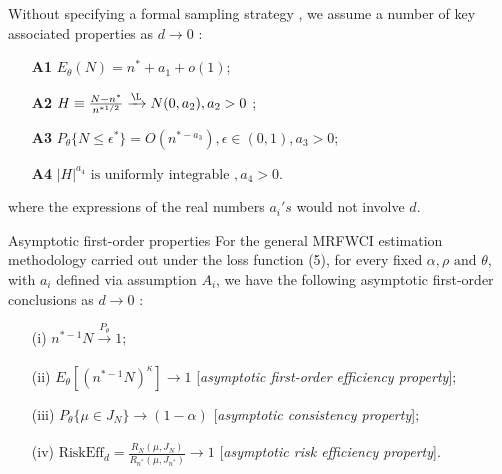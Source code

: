 \documentclass [xcolor=svgnames, t] {beamer}
\begin{document}

\begin{frame}{}
\vspace{15mm}
 Without specifying a formal sampling strategy , we assume a number of key associated properties as $d \xrightarrow{} 0$ :
   
    \begin{itemize}
        \item[\textbf{A1}] $ E_{\theta}(N)=n^* +a_1 +o(1)$;
         \item[\textbf{A2}] $H \equiv \frac{N-n^*}{n^{*1/2}} \xrightarrow{\L} N(0,a_2), a_2>0$ ;
          \item[\textbf{A3}] $P_{\theta}\{ N \le \epsilon^*\}=O(n^{*-a_3}),\epsilon \in (0,1), a_3>0$;
           \item[\textbf{A4}] $|H|^{a_4} \text{ is uniformly integrable },a_4 >0$.
    \end{itemize}
    
    where the expressions of the real numbers $a_i's$ would not involve $d$.
\end{frame}
\begin{frame}{Asymptotic first-order properties}
\vspace{7mm}
For the general MRFWCI estimation methodology carried out under the loss function (5), for every fixed $\alpha, \rho \text{ and } \theta$, with $a_i$ defined via assumption $A_i$, we have the following asymptotic first-order conclusions as $d \xrightarrow{} 0$ :

\begin{itemize}
\item[(i)] $n^{*-1}N \xrightarrow[]{P_{\theta}}1$;
\item[(ii)] $E_{\theta}[(n^{*-1}N)^{\kappa}] \xrightarrow[]{} 1$ [\textit{asymptotic first-order efficiency property}];
\item[(iii)] $P_{\theta} \{ \mu \in J_N\} \xrightarrow[]{} (1-\alpha)$ [\textit{asymptotic consistency property}];
\item[(iv)] $\text{RiskEff}_d =\frac{R_N(\mu,J_N)}{R_{n^*}(\mu,J_{n^*})} \xrightarrow[]{} 1$ [\textit{asymptotic risk efficiency property}].
\end{itemize}
 
\end{frame}
\end{document}
